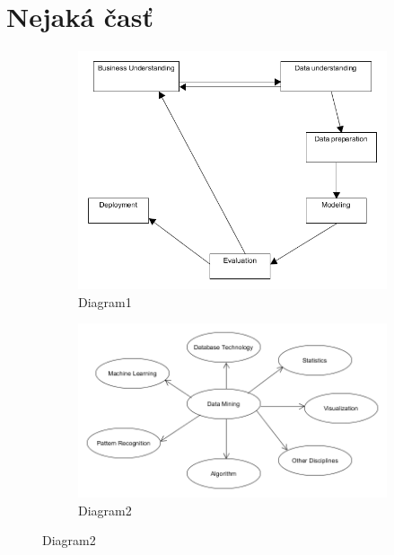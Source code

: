 \documentclass[10pt,twocolumn,twoside,slovak,a4paper]{article}
\begin{document}
\section{Nejaká časť} \label{nejaka}
\begin{figure}[h!]
\centering
\begin{subfigure}[b]{0.4\linewidth}
  \includegraphics[width=\linewidth]{diagram1.png}
  \caption{ Diagram1}
  \label{fig:Diagram1}
\end{subfigure}
\begin{subfigure}[b]{0.4\linewidth}
  \includegraphics[width=\linewidth]{diagram2.png}
  \caption{ Diagram2}
  \label{fig:Diagram2}
\end{subfigure}
\end{figure}
\end{document}

